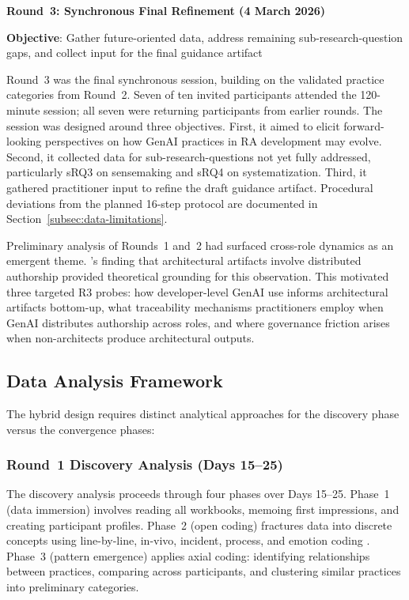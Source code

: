 \textbf{Round~3: Synchronous Final Refinement (4 March 2026)}

\textbf{Objective}: Gather future-oriented data, address remaining sub-research-question gaps, and collect input for the final guidance artifact

Round~3 was the final synchronous session, building on the validated practice
categories from Round~2. Seven of ten invited participants attended the
120-minute session; all seven were returning participants from earlier rounds.
The session was designed around three objectives. First, it aimed to elicit
forward-looking perspectives on how GenAI practices in RA development may
evolve. Second, it collected data for sub-research-questions not yet fully
addressed, particularly sRQ3 on sensemaking and sRQ4 on systematization.
Third, it gathered practitioner input to refine the draft guidance artifact.
Procedural deviations from the planned 16-step protocol are documented in
Section~\ref{subsec:data-limitations}.

Preliminary analysis of Rounds~1 and~2 had surfaced cross-role dynamics as an
emergent theme. \textcite{kotusev_enterprise_2018}'s finding that architectural
artifacts involve distributed authorship provided theoretical grounding for
this observation. This motivated three targeted R3 probes: how developer-level
GenAI use informs architectural artifacts bottom-up, what traceability
mechanisms practitioners employ when GenAI distributes authorship across roles,
and where governance friction arises when non-architects produce architectural
outputs.

\subsection{Data Analysis Framework}

The hybrid design requires distinct analytical approaches for the discovery
phase versus the convergence phases:

\subsubsection{Round~1 Discovery Analysis (Days 15--25)}

The discovery analysis proceeds through four phases over Days 15--25.
Phase~1 (data immersion) involves reading all workbooks, memoing first
impressions, and creating participant profiles. Phase~2 (open coding) fractures
data into discrete concepts using line-by-line, in-vivo, incident, process,
and emotion coding \parencite{charmaz_constructing_2014}. Phase~3 (pattern
emergence) applies axial coding: identifying relationships between practices,
comparing across participants, and clustering similar practices into
preliminary categories.

